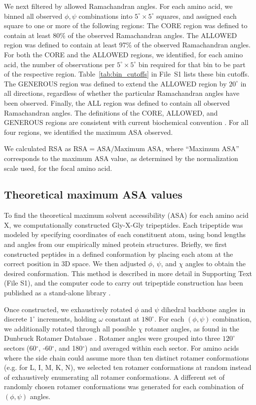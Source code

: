 \documentclass[11pt]{article}
\begin{document}
We next filtered by allowed Ramachandran angles. For each amino acid, we binned all observed $\phi, \psi$ combinations into $5^\circ\times5^\circ$ squares, and assigned each square to one or more of the following regions: The CORE region was defined to contain at least 80\% of the observed Ramachandran angles. The ALLOWED region was defined to contain at least 97\% of the observed Ramachandran angles. For both the CORE and the ALLOWED regions, we identified, for each amino acid, the number of observations per $5^\circ\times5^\circ$ bin required for that bin to be part of the respective region. Table~\ref{tab:bin_cutoffs} in File~S1 lists these bin cutoffs. The GENEROUS region was defined to extend the ALLOWED region by $20^\circ$ in all directions, regardless of whether the particular Ramachandran angles have been observed. Finally, the ALL region was defined to contain all observed Ramachandran angles. The definitions of the CORE, ALLOWED, and GENEROUS regions are consistent with current biochemical convention \cite{Morrisetal1992,Laskowskietal1993}. For all four regions, we identified the maximum ASA observed.

We calculated RSA as $\text{RSA}=\text{ASA}/\text{Maximum ASA}$, where ``Maximum ASA'' corresponds to the maximum ASA value, as determined by the normalization scale used, for the focal amino acid. 



\subsection*{Theoretical maximum ASA values}

To find the theoretical maximum solvent accessibility (ASA) for each amino acid X, we computationally constructed Gly-X-Gly tripeptides. Each tripeptide was modeled by specifying coordinates of each constituent atom, using bond lengths and angles from our empirically mined protein structures. Briefly, we first constructed peptides in a defined conformation by placing each atom at the correct position in 3D space. We then adjusted $\phi$, $\psi$, and $\chi$ angles to obtain the desired conformation. This method is described in more detail in Supporting Text (File S1), and the computer code to carry out tripeptide construction has been published as a stand-alone library \cite{Tienetal2013}. 

Once constructed, we exhaustively rotated $\phi$ and $\psi$ dihedral backbone angles in discrete $1^\circ$ increments, holding $\omega$ constant at $180^\circ$. For each $(\phi, \psi)$ combination, we additionally rotated through all possible $\chi$ rotamer angles, as found in the Dunbruck Rotamer Database \cite{WangDunbrack2003}. Rotamer angles were grouped into three $120^\circ$ sectors (60$^\circ$, -60$^\circ$, and 180$^\circ$) and averaged within each sector. For amino acids where the side chain could assume more than ten distinct rotamer conformations (e.g. for L, I, M, K, N), we selected ten rotamer conformations at random instead of exhaustively enumerating all rotamer conformations. A different set of randomly chosen rotamer conformations was generated for each combination of $(\phi, \psi)$ angles. 
\end{document}
